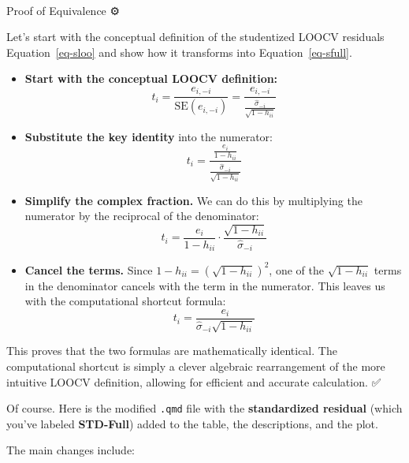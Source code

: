 \documentclass[
  letterpaper,
  DIV=11,
  numbers=noendperiod]{scrreprt}
\makeatletter
\let\oldparagraph\paragraph
\renewcommand{\paragraph}{
    \@ifstar
      \xxxParagraphStar
      \xxxParagraphNoStar
  }
\newcommand{\xxxParagraphStar}[1]{\oldparagraph*{#1}\mbox{}}
\newcommand{\xxxParagraphNoStar}[1]{\oldparagraph{#1}\mbox{}}
\makeatother
\begin{document}
\paragraph{Proof of Equivalence ⚙️}\label{proof-of-equivalence}

Let's start with the conceptual definition of the studentized LOOCV
residuals Equation~\ref{eq-sloo} and show how it transforms into
Equation~\ref{eq-sfull}.

\begin{itemize}
\item
  \textbf{Start with the conceptual LOOCV definition:} \begin{equation}
    t_i = \frac{e_{i,-i}}{\text{SE}(e_{i,-i})} = \frac{e_{i,-i}}{\frac{\hat{\sigma}_{-i}}{\sqrt{1-h_{ii}}}}
    \end{equation}
\item
  \textbf{Substitute the key identity} into the numerator:
  \begin{equation}
    t_i = \frac{\frac{e_i}{1 - h_{ii}}}{\frac{\hat{\sigma}_{-i}}{\sqrt{1 - h_{ii}}}}
    \end{equation}
\item
  \textbf{Simplify the complex fraction.} We can do this by multiplying
  the numerator by the reciprocal of the denominator: \begin{equation}
    t_i = \frac{e_i}{1-h_{ii}} \cdot \frac{\sqrt{1-h_{ii}}}{\hat{\sigma}_{-i}}
    \end{equation}
\item
  \textbf{Cancel the terms.} Since
  \(1 - h_{ii} = (\sqrt{1 - h_{ii}})^2\), one of the
  \(\sqrt{1 - h_{ii}}\) terms in the denominator cancels with the term
  in the numerator. This leaves us with the computational shortcut
  formula: \begin{equation}
    t_i = \frac{e_i}{\hat{\sigma}_{-i}\sqrt{1-h_{ii}}}
    \end{equation}
\end{itemize}

This proves that the two formulas are mathematically identical. The
computational shortcut is simply a clever algebraic rearrangement of the
more intuitive LOOCV definition, allowing for efficient and accurate
calculation. ✅

Of course. Here is the modified \texttt{.qmd} file with the
\textbf{standardized residual} (which you've labeled \textbf{STD-Full})
added to the table, the descriptions, and the plot.

The main changes include:
\end{document}
